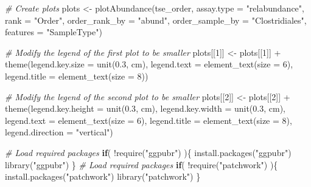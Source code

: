 \documentclass[
]{book}
\newenvironment{Shaded}{\begin{snugshade}}{\end{snugshade}}
\newcommand{\AttributeTok}[1]{\textcolor[rgb]{0.77,0.63,0.00}{#1}}
\newcommand{\CommentTok}[1]{\textcolor[rgb]{0.56,0.35,0.01}{\textit{#1}}}
\newcommand{\ControlFlowTok}[1]{\textcolor[rgb]{0.13,0.29,0.53}{\textbf{#1}}}
\newcommand{\DecValTok}[1]{\textcolor[rgb]{0.00,0.00,0.81}{#1}}
\newcommand{\FloatTok}[1]{\textcolor[rgb]{0.00,0.00,0.81}{#1}}
\newcommand{\FunctionTok}[1]{\textcolor[rgb]{0.00,0.00,0.00}{#1}}
\newcommand{\NormalTok}[1]{#1}
\newcommand{\OtherTok}[1]{\textcolor[rgb]{0.56,0.35,0.01}{#1}}
\newcommand{\SpecialCharTok}[1]{\textcolor[rgb]{0.00,0.00,0.00}{#1}}
\newcommand{\StringTok}[1]{\textcolor[rgb]{0.31,0.60,0.02}{#1}}
\begin{document}
\begin{Shaded}
\begin{Highlighting}[]
\CommentTok{\# Create plots}
\NormalTok{plots }\OtherTok{\textless{}{-}} \FunctionTok{plotAbundance}\NormalTok{(tse\_order,}
            \AttributeTok{assay.type =} \StringTok{"relabundance"}\NormalTok{,}
        \AttributeTok{rank =} \StringTok{"Order"}\NormalTok{,}
            \AttributeTok{order\_rank\_by =} \StringTok{"abund"}\NormalTok{,}
        \AttributeTok{order\_sample\_by =} \StringTok{"Clostridiales"}\NormalTok{,}
            \AttributeTok{features =} \StringTok{"SampleType"}\NormalTok{)}

\CommentTok{\# Modify the legend of the first plot to be smaller }
\NormalTok{plots[[}\DecValTok{1}\NormalTok{]] }\OtherTok{\textless{}{-}}\NormalTok{ plots[[}\DecValTok{1}\NormalTok{]] }\SpecialCharTok{+}
    \FunctionTok{theme}\NormalTok{(}\AttributeTok{legend.key.size =} \FunctionTok{unit}\NormalTok{(}\FloatTok{0.3}\NormalTok{, }\StringTok{\textquotesingle{}cm\textquotesingle{}}\NormalTok{),}
          \AttributeTok{legend.text =} \FunctionTok{element\_text}\NormalTok{(}\AttributeTok{size =} \DecValTok{6}\NormalTok{),}
          \AttributeTok{legend.title =} \FunctionTok{element\_text}\NormalTok{(}\AttributeTok{size =} \DecValTok{8}\NormalTok{))}

\CommentTok{\# Modify the legend of the second plot to be smaller }
\NormalTok{plots[[}\DecValTok{2}\NormalTok{]] }\OtherTok{\textless{}{-}}\NormalTok{ plots[[}\DecValTok{2}\NormalTok{]] }\SpecialCharTok{+}
    \FunctionTok{theme}\NormalTok{(}\AttributeTok{legend.key.height =} \FunctionTok{unit}\NormalTok{(}\FloatTok{0.3}\NormalTok{, }\StringTok{\textquotesingle{}cm\textquotesingle{}}\NormalTok{),}
          \AttributeTok{legend.key.width =} \FunctionTok{unit}\NormalTok{(}\FloatTok{0.3}\NormalTok{, }\StringTok{\textquotesingle{}cm\textquotesingle{}}\NormalTok{),}
          \AttributeTok{legend.text =} \FunctionTok{element\_text}\NormalTok{(}\AttributeTok{size =} \DecValTok{6}\NormalTok{),}
          \AttributeTok{legend.title =} \FunctionTok{element\_text}\NormalTok{(}\AttributeTok{size =} \DecValTok{8}\NormalTok{),}
          \AttributeTok{legend.direction =} \StringTok{"vertical"}\NormalTok{)}

\CommentTok{\# Load required packages}
\ControlFlowTok{if}\NormalTok{( }\SpecialCharTok{!}\FunctionTok{require}\NormalTok{(}\StringTok{"ggpubr"}\NormalTok{) )\{}
    \FunctionTok{install.packages}\NormalTok{(}\StringTok{"ggpubr"}\NormalTok{)}
    \FunctionTok{library}\NormalTok{(}\StringTok{"ggpubr"}\NormalTok{)}
\NormalTok{\}}
\CommentTok{\# Load required packages}
\ControlFlowTok{if}\NormalTok{( }\SpecialCharTok{!}\FunctionTok{require}\NormalTok{(}\StringTok{"patchwork"}\NormalTok{) )\{}
    \FunctionTok{install.packages}\NormalTok{(}\StringTok{"patchwork"}\NormalTok{)}
    \FunctionTok{library}\NormalTok{(}\StringTok{"patchwork"}\NormalTok{)}
\NormalTok{\}}


\end{Highlighting}
\end{Shaded}
\end{document}
